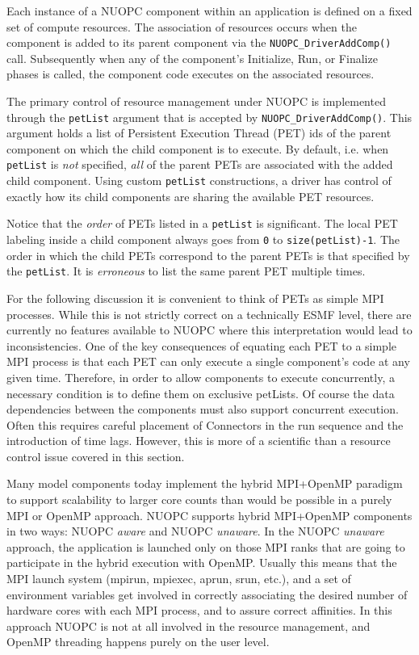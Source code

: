 %

\label{AdvancedResourceControl}

Each instance of a NUOPC component within an application is defined on a fixed set of compute resources. The association of resources occurs when the component is added to its parent component via the {\tt NUOPC\_DriverAddComp()} call. Subsequently when any of the component's Initialize, Run, or Finalize phases is called, the component code executes on the associated resources.

The primary control of resource management under NUOPC is implemented through the {\tt petList} argument that is accepted by {\tt NUOPC\_DriverAddComp()}. This argument holds a list of Persistent Execution Thread (PET) ids of the parent component on which the child component is to execute. By default, i.e. when {\tt petList} is {\em not} specified, {\em all} of the parent PETs are associated with the added child component. Using custom {\tt petList} constructions, a driver has control of exactly how its child components are sharing the available PET resources.

Notice that the {\em order} of PETs listed in a {\tt petList} is significant. The local PET labeling inside a child component always goes from {\tt 0} to {\tt size(petList)-1}. The order in which the child PETs correspond to the parent PETs is that specified by the {\tt petList}. It is {\em erroneous} to list the same parent PET multiple times.

For the following discussion it is convenient to think of PETs as simple MPI processes. While this is not strictly correct on a technically ESMF level, there are currently no features available to NUOPC where this interpretation would lead to inconsistencies. One of the key consequences of equating each PET to a simple MPI process is that each PET can only execute a single component's code at any given time. Therefore, in order to allow components to execute concurrently, a necessary condition is to define them on exclusive petLists. Of course the data dependencies between the components must also support concurrent execution. Often this requires careful placement of Connectors in the run sequence and the introduction of time lags. However, this is more of a scientific than a resource control issue covered in this section.

Many model components today implement the hybrid MPI+OpenMP paradigm to support scalability to larger core counts than would be possible in a purely MPI or OpenMP approach. NUOPC supports hybrid MPI+OpenMP components in two ways: NUOPC {\em aware} and NUOPC {\em unaware}. In the NUOPC {\em unaware} approach, the application is launched only on those MPI ranks that are going to participate in the hybrid execution with OpenMP. Usually this means that the MPI launch system (mpirun, mpiexec, aprun, srun, etc.), and a set of environment variables get involved in correctly associating the desired number of hardware cores with each MPI process, and to assure correct affinities. In this approach NUOPC is not at all involved in the resource management, and OpenMP threading happens purely on the user level.


